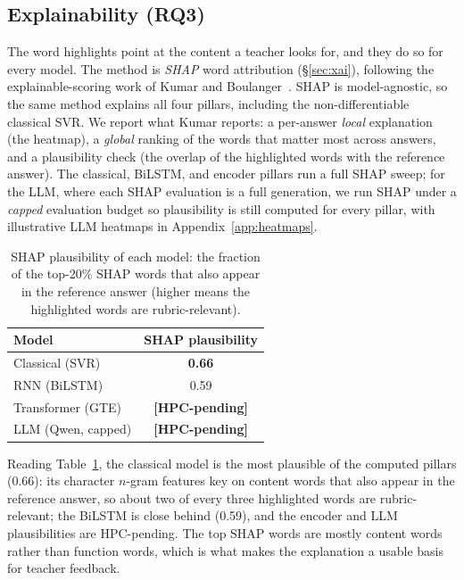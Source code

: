 \subsection{Explainability (RQ3)}
\label{sec:results-xai}
The word highlights point at the content a teacher looks for, and they do so for every model. The method
is \emph{SHAP} word attribution (\S\ref{sec:xai}), following the explainable-scoring work of Kumar and
Boulanger~\citep{kumar2020explainable}. SHAP is model-agnostic, so the same method explains all four
pillars, including the non-differentiable classical SVR. We report what Kumar reports: a per-answer
\emph{local} explanation (the heatmap), a \emph{global} ranking of the words that matter most across
answers, and a plausibility check (the overlap of the highlighted words with the reference answer).
The classical, BiLSTM, and encoder pillars run a full SHAP sweep; for the LLM, where each SHAP
evaluation is a full generation, we run SHAP under a \emph{capped} evaluation budget so plausibility is
still computed for every pillar, with illustrative LLM heatmaps in Appendix~\ref{app:heatmaps}.

\begin{table}[t]
\centering
\caption[SHAP plausibility of each model]{SHAP plausibility of each model: the fraction of the top-20\%
SHAP words that also appear in the reference answer (higher means the highlighted words are
rubric-relevant).}
\label{tab:xai}
\small
\begin{tabular}{@{}lc@{}}
\toprule
Model & SHAP plausibility \\
\midrule
Classical (SVR)   & \textbf{0.66} \\
RNN (BiLSTM)      & 0.59 \\
Transformer (GTE) & \textbf{[HPC-pending]} \\
LLM (Qwen, capped) & \textbf{[HPC-pending]} \\
\bottomrule
\end{tabular}
\end{table}

Reading Table~\ref{tab:xai}, the classical model is the most plausible of the computed pillars
(0.66): its character $n$-gram features key on content words that also appear in the reference answer,
so about two of every three highlighted words are rubric-relevant; the BiLSTM is close behind (0.59),
and the encoder and LLM plausibilities are HPC-pending.
The top SHAP words are mostly content words rather than function words, which is what makes the
explanation a usable basis for teacher feedback.

